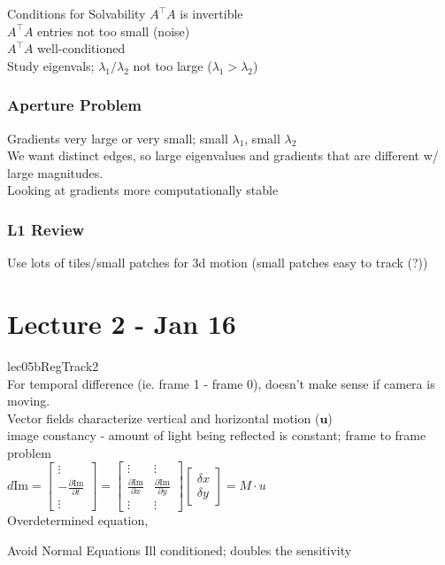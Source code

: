 \documentclass{article}
\begin{document}
\begin{expln}
    {Conditions for Solvability}{}
    $A^\top A$ is invertible \\
    $A^\top A$ entries not too small (noise) \\
    $A^\top A$ well-conditioned \\
    Study eigenvals; $\lambda_1 / \lambda_2$ not too large ($\lambda_1 > \lambda_2$)
\end{expln}

\subsubsection{Aperture Problem}
Gradients very large or very small; small $\lambda_1$, small $\lambda_2$\\
We want distinct edges, so large eigenvalues and gradients that are different w/ large magnitudes.\\
Looking at gradients more computationally stable


\subsubsection{L1 Review}
Use lots of tiles/small patches for 3d motion (small patches easy to track (?))

\section{Lecture 2 - Jan 16}
lec05bRegTrack2\\
For temporal difference (ie. frame 1 - frame 0), doesn't make sense if camera is moving. \\
Vector fields characterize vertical and horizontal motion ($\mathbf u$) \\
image constancy - amount of light being reflected is constant; frame to frame problem
\\
\begin{math}
    d\mathrm{Im} = \begin{bmatrix}
        \vdots \\ -\frac{\partial \mathrm{Im}}{\partial t} \\ \vdots
    \end{bmatrix} =
    \begin{bmatrix}
        \vdots & \vdots \\ \frac{\partial \mathrm{Im}}{\partial x} & \frac{\partial \mathrm{Im}}{\partial y} \\ \vdots & \vdots
    \end{bmatrix} \begin{bmatrix}
        \delta x \\ \delta y
    \end{bmatrix} = M \cdot u
\end{math}
\\
Overdetermined equation, 
\begin{expln}
    {Avoid Normal Equations}{}
    Ill conditioned; doubles the sensitivity
\end{expln}
\end{document}
